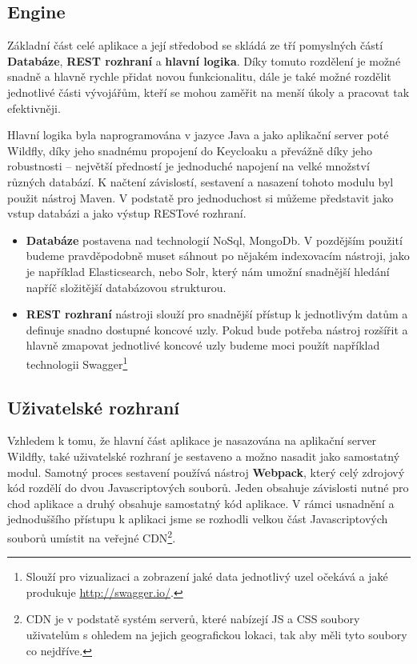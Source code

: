 \subsection{Engine}
\par Základní část celé aplikace a její středobod se skládá ze tří pomyslných částí \textbf{Databáze}, \textbf{REST rozhraní} a \textbf{hlavní logika}. Díky tomuto rozdělení je možné snadně a hlavně rychle přidat novou funkcionalitu, dále je také možné rozdělit jednotlivé části vývojářům, kteří se mohou zaměřit na menší úkoly a pracovat tak efektivněji.

\par Hlavní logika byla naprogramována v jazyce Java a jako aplikační server poté Wildfly, díky jeho snadnému propojení do Keycloaku a převážně díky jeho robustnosti -- největší předností je jednoduché napojení na velké množství různých databází. K načtení závislostí, sestavení a nasazení tohoto modulu byl použit nástroj Maven. V podstatě pro jednoduchost si můžeme představit jako vstup databázi a jako výstup RESTové rozhraní.

\begin{itemize}
\item \textbf{Databáze} postavena nad technologií NoSql, MongoDb. V pozdějším použití budeme pravděpodobně muset sáhnout po nějakém indexovacím nástroji, jako je například Elasticsearch, nebo Solr, který nám umožní snadnější hledání napříč složitější databázovou strukturou.
\item \textbf{REST rozhraní} nástroji slouží pro snadnější přístup k jednotlivým datům a definuje snadno dostupné koncové uzly. Pokud bude potřeba nástroj rozšířit a hlavně zmapovat jednotlivé koncové uzly budeme moci použít například technologii Swagger\footnote{Slouží pro vizualizaci a zobrazení jaké data jednotlivý uzel očekává a jaké produkuje \url{http://swagger.io/}.}
\end{itemize}

\subsection{Uživatelské rozhraní}
\par Vzhledem k tomu, že hlavní část aplikace je nasazována na aplikační server Wildfly, také uživatelské rozhraní je sestaveno a možno nasadit jako samostatný modul. Samotný proces sestavení používá nástroj \textbf{Webpack}, který celý zdrojový kód rozdělí do dvou Javascriptových souborů. Jeden obsahuje závislosti nutné pro chod aplikace a druhý obsahuje samostatný kód aplikace. V rámci usnadnění a jednoduššího přístupu k aplikaci jsme se rozhodli velkou část Javascriptových souborů umístit na veřejné CDN\footnote{CDN je v podstatě systém serverů, které nabízejí JS a CSS soubory uživatelům s ohledem na jejich geografickou lokaci, tak aby měli tyto soubory co nejdříve.}.

